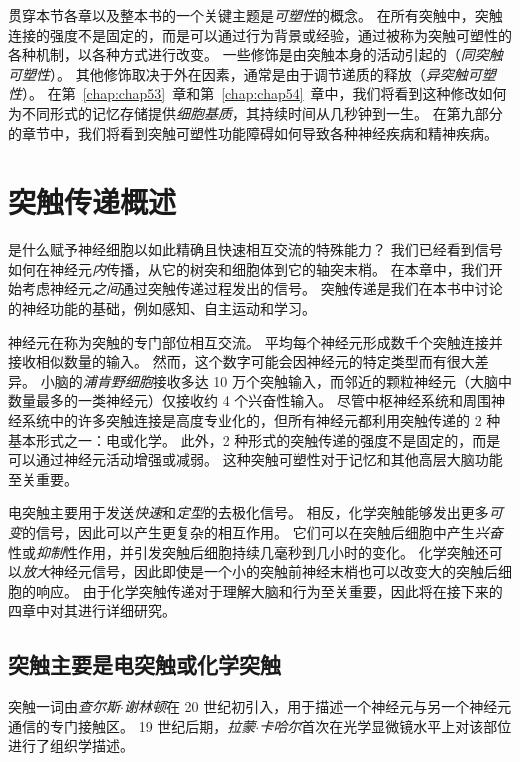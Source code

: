 贯穿本节各章以及整本书的一个关键主题是\textit{可塑性}的概念。
在所有突触中，突触连接的强度不是固定的，而是可以通过行为背景或经验，通过被称为突触可塑性的各种机制，以各种方式进行改变。
一些修饰是由突触本身的活动引起的（\textit{同突触可塑性}）。
其他修饰取决于外在因素，通常是由于调节递质的释放（\textit{异突触可塑性}）。
在第~\ref{chap:chap53}~章和第~\ref{chap:chap54}~章中，我们将看到这种修改如何为不同形式的记忆存储提供\textit{细胞基质}，其持续时间从几秒钟到一生。
在第九部分的章节中，我们将看到突触可塑性功能障碍如何导致各种神经疾病和精神疾病。



\chapter{突触传递概述} \label{chap:chap11}

是什么赋予神经细胞以如此精确且快速相互交流的特殊能力？
我们已经看到信号如何在神经元\textit{内}传播，从它的树突和细胞体到它的轴突末梢。
在本章中，我们开始考虑神经元\textit{之间}通过突触传递过程发出的信号。
突触传递是我们在本书中讨论的神经功能的基础，例如感知、自主运动和学习。


神经元在称为突触的专门部位相互交流。
平均每个神经元形成数千个突触连接并接收相似数量的输入。
然而，这个数字可能会因神经元的特定类型而有很大差异。
小脑的\textit{浦肯野细胞}接收多达 10 万个突触输入，而邻近的颗粒神经元（大脑中数量最多的一类神经元）仅接收约 4 个兴奋性输入。
尽管中枢神经系统和周围神经系统中的许多突触连接是高度专业化的，但所有神经元都利用突触传递的 2 种基本形式之一：电或化学。
此外，2 种形式的突触传递的强度不是固定的，而是可以通过神经元活动增强或减弱。
这种突触可塑性对于记忆和其他高层大脑功能至关重要。


电突触主要用于发送\textit{快速}和\textit{定型}的去极化信号。
相反，化学突触能够发出更多\textit{可变}的信号，因此可以产生更复杂的相互作用。
它们可以在突触后细胞中产生\textit{兴奋}性或\textit{抑制}性作用，并引发突触后细胞持续几毫秒到几小时的变化。
化学突触还可以\textit{放大}神经元信号，因此即使是一个小的突触前神经末梢也可以改变大的突触后细胞的响应。
由于化学突触传递对于理解大脑和行为至关重要，因此将在接下来的四章中对其进行详细研究。



\section{突触主要是电突触或化学突触}

突触一词由\textit{查尔斯$\cdot$谢林顿}在 20 世纪初引入，用于描述一个神经元与另一个神经元通信的专门接触区。
19 世纪后期，\textit{拉蒙$\cdot$卡哈尔}首次在光学显微镜水平上对该部位进行了组织学描述。


